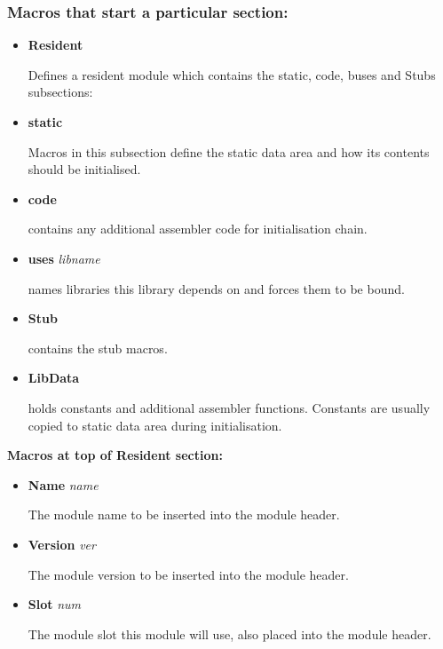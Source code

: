 \subsubsection{Macros that start a particular section:}
\begin{itemize}

\item {\bf Resident}

Defines a resident module which contains the static, code,
buses and Stubs subsections:

\item {\bf static}

Macros in this subsection define the static data area and how its
contents should be initialised.

\item {\bf code}

contains any additional assembler code for initialisation chain.

\item {\bf uses} {\it libname}

names libraries this library depends on and forces them to be
bound.

\item {\bf Stub} 

contains the stub macros.

\item {\bf LibData} 

holds constants and additional assembler functions.
Constants are usually copied to static data area during initialisation.
\end{itemize}
\vspace{0.25cm}

{\bf Macros at top of Resident section:}
\vspace{0.25cm}

\begin{itemize}
\item {\bf Name} {\it name}

The module name to be inserted into the module header.

\item {\bf Version} {\it ver} 

The module version to be inserted into the module header.

\item {\bf Slot} {\it num} 

The module slot this module will use, also placed into the
module header.
\end{itemize}
\vspace{0.25cm}

